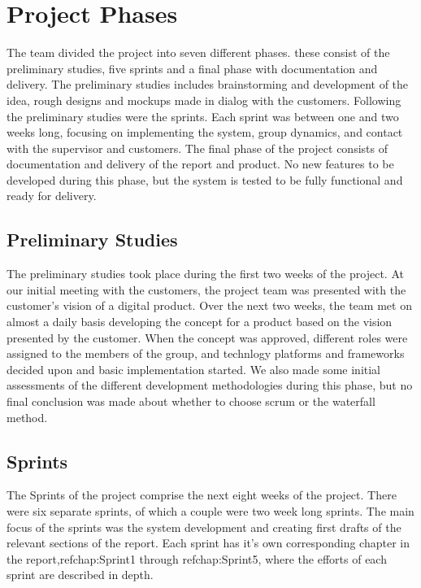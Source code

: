 \section{Project Phases}
\label{sec:IntroProjPhases}
The team divided the project into seven different phases. these consist of the preliminary studies, five sprints and a final phase with documentation and delivery. The preliminary studies includes brainstorming and development of the idea, rough designs and mockups made in dialog with the customers. Following the preliminary studies were the sprints. Each sprint was between one and two weeks long, focusing on implementing the system, group dynamics, and contact with the supervisor and customers. The final phase of the project consists of documentation and delivery of the report and product. No new features to be developed during this phase, but the system is tested to be fully functional and ready for delivery. 

\subsection{Preliminary Studies}
\label{subsec:IntroProjPhasesPrelim}
The preliminary studies took place during the first two weeks of the project. At our initial meeting with the customers, the project team was presented with the customer’s vision of a digital product. Over the next two weeks, the team met on almost a daily basis developing the concept for a product based on the vision presented by the customer. When the concept was approved, different roles were assigned to the members of the group, and technlogy platforms and frameworks decided upon and basic implementation started. We also made some initial assessments of the different development methodologies during this phase, but no final conclusion was made about whether to choose scrum or the waterfall method.

\subsection{Sprints}
\label{subsec:IntroProjPhasesSprints}
The Sprints of the project comprise the next eight weeks of the project. There were six separate sprints, of which a couple were two week long sprints. The main focus of the sprints was the system development and creating first drafts of the relevant sections of the report. Each sprint has it’s own corresponding chapter in the report,ref{chap:Sprint1} through ref{chap:Sprint5}, where the efforts of each sprint are described in depth.

